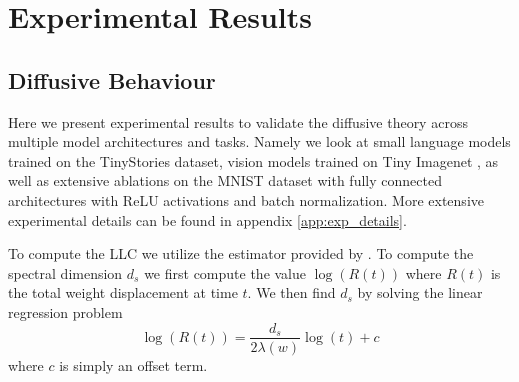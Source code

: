 \documentclass{article} %
\theoremstyle{definition}
\begin{document}


\section{Experimental Results}\label{sec:exp_results}
\subsection{Diffusive Behaviour}
Here we present experimental results to validate the diffusive theory across multiple model architectures and tasks. Namely we look at small language models trained on the TinyStories dataset\citep{eldan2023tinystoriessmalllanguagemodels}, vision models trained on Tiny Imagenet \citep{Le2015TinyIV}, as well as extensive ablations on the MNIST dataset \citep{mnist} with fully connected architectures with ReLU activations and batch normalization. More extensive experimental details can be found in appendix \ref{app:exp_details}.

To compute the LLC we utilize the estimator provided by \citep{devinterpcode}. To compute the spectral dimension $d_s$ we first compute the value $\log(R(t))$ where $R(t)$ is the total weight displacement at time $t$. We then find $d_s$ by solving the linear regression problem
\begin{equation}\label{eq:spect_est}
    \log(R(t)) = \frac{d_s}{2\lambda(w)} \log(t) + c
\end{equation}
where $c$ is simply an offset term.
\end{document}
